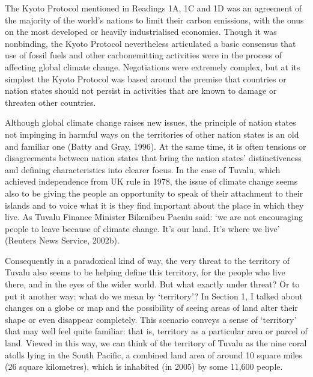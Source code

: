 \documentclass[letterpaper,10pt,english]{sphinxmanual}
\begin{document}
The Kyoto Protocol mentioned in Readings 1A, 1C and 1D was an agreement of the majority of the world’s nations to limit their carbon emissions, with the onus on the most developed or heavily industrialised economies. Though it was non\sphinxhyphen{}binding, the Kyoto Protocol nevertheless articulated a basic consensus that use of fossil fuels and other carbon\sphinxhyphen{}emitting activities were in the process of affecting global climate change. Negotiations were extremely complex, but at its simplest the Kyoto Protocol
was based around the premise that countries or nation states should not persist in activities that are known to damage or threaten other countries.

Although global climate change raises new issues, the principle of nation states not impinging in harmful ways on the territories of other nation states is an old and familiar one (Batty and Gray, 1996). At the same time, it is often tensions or disagreements between nation states that bring the nation states’ distinctiveness and defining characteristics into clearer focus. In the case of Tuvalu, which achieved independence from UK rule in 1978, the issue of climate change seems also to be
giving the people an opportunity to speak of their attachment to their islands and to voice what it is they find important about the place in which they live. As Tuvalu Finance Minister Bikenibeu Paeniu said: ‘we are not encouraging people to leave because of climate change. It’s our land. It’s where we live’ (Reuters News Service, 2002b).

Consequently in a paradoxical kind of way, the very threat to the territory of Tuvalu also seems to be helping define this territory, for the people who live there, and in the eyes of the wider world. But what exactly  under threat? Or to put it another way: what do we mean by ‘territory’? In Section 1, I talked about changes on a globe or map and the possibility of seeing areas of land alter their shape or even disappear completely. This scenario conveys a sense of ‘territory’ that may well
feel quite familiar: that is, territory as a particular area or parcel of land. Viewed in this way, we can think of the territory of Tuvalu as the nine coral atolls lying in the South Pacific, a combined land area of around 10 square miles (26 square kilometres), which is inhabited (in 2005) by some 11,600 people.
\end{document}
